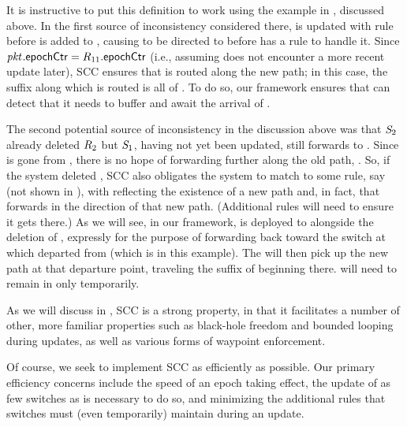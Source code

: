 \medskip

It is instructive to put this definition to work using the example in
, discussed above.  In the first source of
inconsistency considered there,  is updated with rule
 before  is added to , causing
\pktID{} to be directed to  before  has a rule
to handle it.  Since $\pktID{}{\epochField} =
\ruleID{11}{\epochField}$ (i.e., assuming \pktID{} does not encounter a
more recent update later), SCC ensures that \pktID{} is routed along
the new path; in this case, the suffix along which \pktID{} is routed
is all of \newPath{\pktID{}}.  To do so, our framework ensures that
 can detect that it needs to buffer \pktID{} and await the
arrival of .

The second potential source of inconsistency in the discussion above
was that $\switchID{2}$ already deleted $\ruleID{2}$ but
$\switchID{1}$, having not yet been updated, still forwards \pktID{}
to .  Since  is gone from , there is
no hope of forwarding \pktID{} further along the old path,
\oldPath{\pktID{}}.  So, if the system deleted , SCC also
obligates the system to match \pktID{} to some rule, say 
(not shown in ), with 
reflecting the existence of a new path \newPath{\pktID{}} and, in
fact, that forwards \pktID{} in the direction of that new path.
(Additional rules will need to ensure it gets there.)  As we will see,
in our framework,  is deployed to  alongside the
deletion of , expressly for the purpose of forwarding
\pktID{} back toward the switch at which \newPath{\pktID{}} departed
from \oldPath{\pktID{}} (which is  in this example).  The
\pktID{} will then pick up the new path at that departure point,
traveling the suffix of \newPath{\pktID{}} beginning there.
 will need to remain in  only temporarily.

As we will discuss in , SCC is a strong
property, in that it facilitates a number of other, more familiar
properties such as black-hole freedom and bounded looping during
updates, as well as various forms of waypoint enforcement.

Of course, we seek to implement SCC as efficiently as possible.  Our
primary efficiency concerns include the speed of an epoch taking
effect, the update of as few switches as is necessary to do so, and
minimizing the additional rules that switches must (even temporarily)
maintain during an update.

